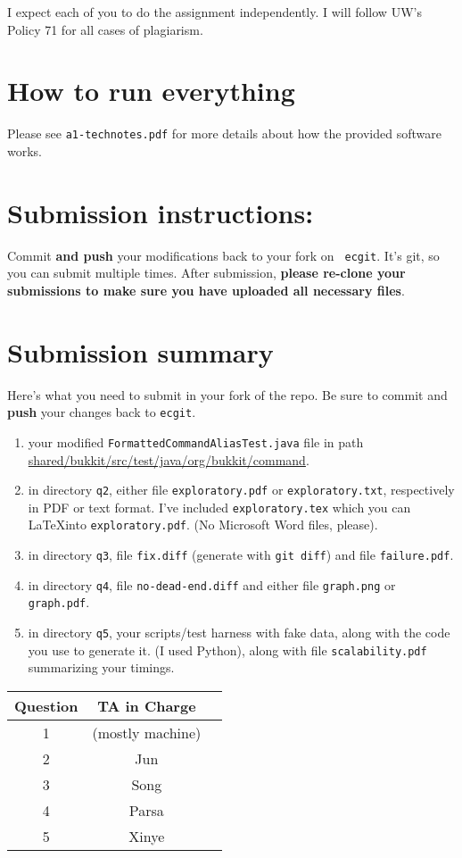 \documentclass[10pt,hidelinks]{article}
\begin{document}
I expect each of you to do the assignment independently. I will follow UW's Policy 71 for all cases of plagiarism.
 
\section*{How to run everything}
Please see {\tt a1-technotes.pdf} for more details about how the provided software works.
\newpage
 \section*{Submission instructions:} 
Commit {\bf and push} your modifications back to your fork on {\tt
  ecgit}.  It's git, so you can submit multiple times. After
submission, {\bf please re-clone your submissions to make sure you
  have uploaded all necessary files}.
 
\section*{Submission summary}
Here's what you need to submit in your fork of the repo. Be sure to commit
and {\bf push} your changes back to {\tt ecgit}.
\begin{enumerate}
\item your modified {\tt FormattedCommandAliasTest.java} file in path
\url{shared/bukkit/src/test/java/org/bukkit/command}.
\item in directory {\tt q2}, either file {\tt exploratory.pdf} or {\tt exploratory.txt}, respectively
in PDF or text format. I've included {\tt exploratory.tex} which you can
\LaTeX into {\tt exploratory.pdf}. (No Microsoft Word files, please).
\item in directory {\tt q3}, file {\tt fix.diff} (generate with {\tt git diff}) 
and file {\tt failure.pdf}.
\item in directory {\tt q4}, file {\tt no-dead-end.diff} and
either file {\tt graph.png} or {\tt graph.pdf}.
\item in directory {\tt q5}, your scripts/test harness with fake data,
along with the code you use to generate it. (I used Python), along with 
file {\tt scalability.pdf} summarizing your timings.
\end{enumerate}
 
 \begin{center}
 \begin{tabular}{c|cc}
 Question   &  TA in Charge \\ \hline
1 & (mostly machine) \\ 
2 & Jun \\ 
3 & Song \\ 
4 & Parsa \\
5 & Xinye
 \end{tabular}
 \end{center}
\end{document}
